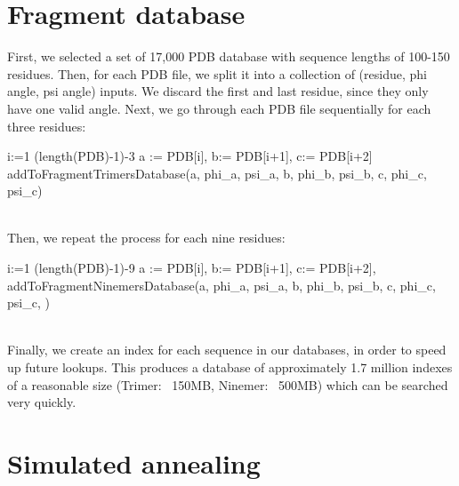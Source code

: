 \documentclass{article}
\begin{document}
\begin{enumerate}
\section{Fragment database}

First, we selected a set of 17,000 PDB database with sequence lengths of 100-150 residues.  Then, for each PDB file, we split it into a collection of (residue, phi angle, psi angle) inputs.  We discard the first and last residue, since they only have one valid angle.  Next, we go through each PDB file sequentially for each three residues:
\begin{program}

  \FOR i:=1 \TO (length(PDB)-1)-3  \DO
	a := PDB[i], b:= PDB[i+1], c:= PDB[i+2]
     	addToFragmentTrimersDatabase(a, phi_a, psi_a, b, phi_b, psi_b, c, phi_c, psi_c)\\\\
\END
\end{program}

Then, we repeat the process for each nine residues:

\begin{program}
  \FOR i:=1 \TO (length(PDB)-1)-9  \DO
	a := PDB[i], b:= PDB[i+1], c:= PDB[i+2],  \dotso
	addToFragmentNinemersDatabase(a, phi_a, psi_a, b, phi_b, psi_b, c, phi_c, psi_c, \dotso)\\\\
\END
\end{program}

Finally, we create an index for each sequence in our databases, in order to speed up future lookups.  This produces a database of approximately 1.7 million indexes of a reasonable size (Trimer: ~150MB, Ninemer: ~500MB) which can be searched very quickly.

\section{Simulated annealing}




\end{enumerate}
\end{document}
